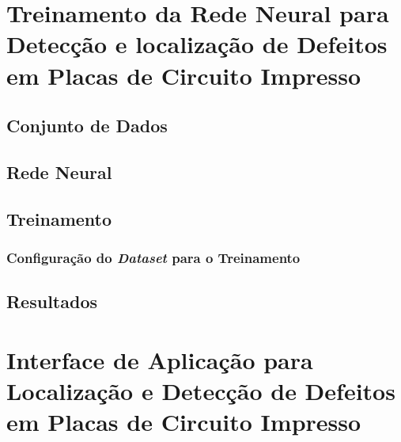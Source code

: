 \chapter{Treinamento da Rede Neural para Detecção e localização de Defeitos em Placas de Circuito Impresso} \label{cap:treinamento}


\section{Conjunto de Dados} \label{cap:treinamento-dataset}


\section{Rede Neural} \label{cap:treinamento-rn}

\section{Treinamento} \label{cap:treinamento-treinamento}

\subsection{Configuração do \textit{Dataset} para o Treinamento} \label{cap:treinamento-treinamento-config}

\section{Resultados} \label{cap:treinamento-resultados}


\chapter{Interface de Aplicação para Localização e Detecção de Defeitos em Placas de Circuito Impresso} \label{cap:api}
